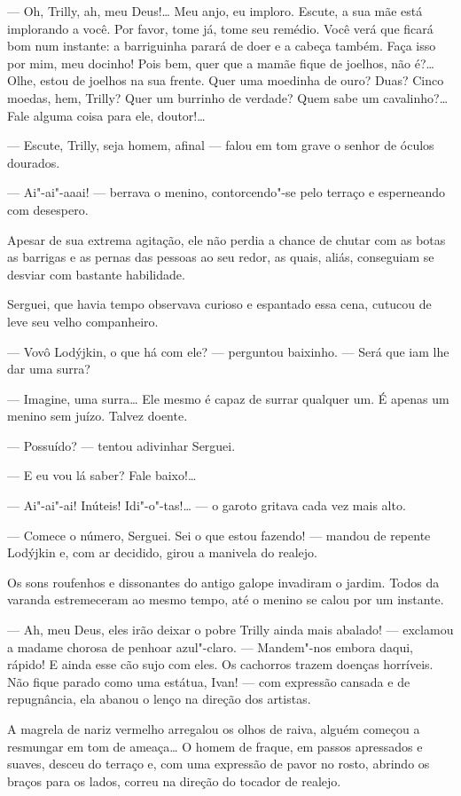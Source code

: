 --- Oh, Trilly, ah, meu Deus!\ldots{} Meu anjo, eu imploro. Escute, a sua mãe
está implorando a você. Por favor, tome já, tome seu remédio. Você verá
que ficará bom num instante: a barriguinha parará de doer e a cabeça
também. Faça isso por mim, meu docinho! Pois bem, quer que a mamãe fique
de joelhos, não é?\ldots{} Olhe, estou de joelhos na sua frente. Quer uma
moedinha de ouro? Duas? Cinco moedas, hem, Trilly? Quer um burrinho
de verdade? Quem sabe um cavalinho?\ldots{} Fale alguma coisa para ele,
doutor!\ldots{}

--- Escute, Trilly, seja homem, afinal --- falou em tom grave o senhor
de óculos dourados.

--- Ai"-ai"-aaai! --- berrava o menino, contorcendo"-se pelo terraço e
esperneando com desespero.

Apesar de sua extrema agitação, ele não perdia a chance de chutar com as
botas as barrigas e as pernas das pessoas ao seu redor, as quais, aliás,
conseguiam se desviar com bastante habilidade.

Serguei, que havia tempo observava curioso e espantado essa cena,
cutucou de leve seu velho companheiro.

--- Vovô Lodýjkin, o que há com ele? --- perguntou baixinho. --- Será
que iam lhe dar uma surra?

--- Imagine, uma surra\ldots{} Ele mesmo é capaz de surrar qualquer um. É
apenas um menino sem juízo. Talvez doente.

--- Possuído? --- tentou adivinhar Serguei.

--- E eu vou lá saber? Fale baixo!\ldots{}

--- Ai"-ai"-ai! Inúteis! Idi"-o"-tas!\ldots{} --- o garoto gritava cada vez mais
alto.

--- Comece o número, Serguei. Sei o que estou fazendo! --- mandou de
repente Lodýjkin e, com ar decidido, girou a manivela do realejo.

Os sons roufenhos e dissonantes do antigo galope invadiram o jardim.
Todos da varanda estremeceram ao mesmo tempo, até o menino se calou por
um instante.

--- Ah, meu Deus, eles irão deixar o pobre Trilly ainda mais abalado!
--- exclamou a madame chorosa de penhoar azul"-claro. --- Mandem"-nos
embora daqui, rápido! E ainda esse cão sujo com eles. Os cachorros
trazem doenças horríveis. Não fique parado como uma estátua, Ivan! ---
com expressão cansada e de repugnância, ela abanou o lenço na direção
dos artistas.

A magrela de nariz vermelho arregalou os olhos de raiva, alguém começou
a resmungar em tom de ameaça\ldots{} O homem de fraque, em passos apressados
e suaves, desceu do terraço e, com uma expressão de pavor no rosto,
abrindo os braços para os lados, correu na direção do tocador de
realejo.

